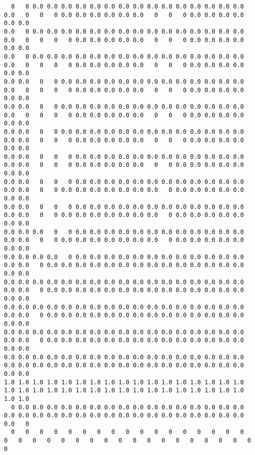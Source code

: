 \begin{verbatim}
  0   0 0.0 0.0 0.0 0.0 0.0 0.0 0.0 0.0 0.0 0.0 0.0 0.0 0.0 0.0 0.0 0.0   0   0   0 0.0 0.0 0.0 0.0 0.0 0.0   0   0   0 0.0 0.0 0.0 0.0 0.0 0.0
0.0   0 0.0 0.0 0.0 0.0 0.0 0.0 0.0 0.0 0.0 0.0 0.0 0.0 0.0 0.0 0.0 0.0   0   0   0   0 0.0 0.0 0.0 0.0 0.0   0   0   0 0.0 0.0 0.0 0.0 0.0 0.0
0.0   0 0.0 0.0 0.0 0.0 0.0 0.0 0.0 0.0 0.0 0.0 0.0 0.0 0.0 0.0 0.0 0.0   0   0   0   0 0.0 0.0 0.0 0.0 0.0   0   0   0 0.0 0.0 0.0 0.0 0.0 0.0
0.0 0.0   0   0 0.0 0.0 0.0 0.0 0.0 0.0 0.0 0.0 0.0 0.0 0.0 0.0 0.0 0.0   0   0   0   0 0.0 0.0 0.0 0.0 0.0   0   0   0 0.0 0.0 0.0 0.0 0.0 0.0
0.0 0.0   0   0 0.0 0.0 0.0 0.0 0.0 0.0 0.0 0.0 0.0 0.0 0.0 0.0 0.0 0.0   0   0   0   0 0.0 0.0 0.0 0.0 0.0   0   0   0 0.0 0.0 0.0 0.0 0.0 0.0
0.0 0.0   0   0 0.0 0.0 0.0 0.0 0.0 0.0 0.0 0.0 0.0 0.0 0.0 0.0 0.0 0.0 0.0   0   0   0 0.0 0.0 0.0 0.0 0.0   0   0   0 0.0 0.0 0.0 0.0 0.0 0.0
0.0 0.0   0   0   0 0.0 0.0 0.0 0.0 0.0 0.0 0.0 0.0 0.0 0.0 0.0 0.0 0.0 0.0   0   0   0 0.0 0.0 0.0 0.0 0.0   0   0 0.0 0.0 0.0 0.0 0.0 0.0 0.0
0.0 0.0   0   0   0 0.0 0.0 0.0 0.0 0.0 0.0 0.0 0.0 0.0 0.0 0.0 0.0 0.0 0.0   0   0 0.0 0.0 0.0 0.0 0.0 0.0 0.0   0 0.0 0.0 0.0 0.0 0.0 0.0 0.0
0.0 0.0   0   0   0 0.0 0.0 0.0 0.0 0.0 0.0 0.0 0.0 0.0 0.0 0.0 0.0 0.0 0.0   0   0 0.0 0.0 0.0 0.0 0.0 0.0 0.0   0 0.0 0.0 0.0 0.0 0.0 0.0 0.0
0.0 0.0 0.0   0   0 0.0 0.0 0.0 0.0 0.0 0.0 0.0 0.0 0.0 0.0 0.0 0.0 0.0 0.0   0   0 0.0 0.0 0.0 0.0 0.0 0.0 0.0   0 0.0 0.0 0.0 0.0 0.0 0.0 0.0
0.0 0.0 0.0 0.0   0 0.0 0.0 0.0 0.0 0.0 0.0 0.0 0.0 0.0 0.0 0.0 0.0 0.0 0.0   0 0.0 0.0 0.0 0.0 0.0 0.0 0.0 0.0 0.0 0.0 0.0 0.0 0.0 0.0 0.0 0.0
0.0 0.0 0.0 0.0 0.0 0.0 0.0 0.0 0.0 0.0 0.0 0.0 0.0 0.0 0.0 0.0 0.0 0.0 0.0   0 0.0 0.0 0.0 0.0 0.0 0.0 0.0 0.0 0.0 0.0 0.0 0.0 0.0 0.0 0.0 0.0
0.0 0.0 0.0 0.0 0.0 0.0 0.0 0.0 0.0 0.0 0.0 0.0 0.0 0.0 0.0 0.0 0.0 0.0 0.0   0 0.0 0.0 0.0 0.0 0.0 0.0 0.0 0.0 0.0 0.0 0.0 0.0 0.0 0.0 0.0 0.0
0.0 0.0 0.0 0.0 0.0 0.0 0.0 0.0 0.0 0.0 0.0 0.0 0.0 0.0 0.0 0.0 0.0 0.0 0.0   0 0.0 0.0 0.0 0.0 0.0 0.0 0.0 0.0 0.0 0.0 0.0 0.0 0.0 0.0 0.0 0.0
0.0 0.0 0.0 0.0 0.0 0.0 0.0 0.0 0.0 0.0 0.0 0.0 0.0 0.0 0.0 0.0 0.0 0.0 0.0 0.0 0.0 0.0 0.0 0.0 0.0 0.0 0.0 0.0 0.0 0.0 0.0 0.0 0.0 0.0 0.0 0.0
1.0 1.0 1.0 1.0 1.0 1.0 1.0 1.0 1.0 1.0 1.0 1.0 1.0 1.0 1.0 1.0 1.0 1.0 1.0 1.0 1.0 1.0 1.0 1.0 1.0 1.0 1.0 1.0 1.0 1.0 1.0 1.0 1.0 1.0 1.0 1.0
  0 0.0 0.0 0.0 0.0 0.0 0.0 0.0 0.0 0.0 0.0 0.0 0.0 0.0 0.0 0.0 0.0 0.0 0.0 0.0 0.0 0.0 0.0 0.0 0.0 0.0 0.0 0.0 0.0 0.0 0.0 0.0 0.0 0.0 0.0   0
  0   0   0   0   0   0   0   0   0   0   0   0   0   0   0   0   0   0   0   0   0   0   0   0   0   0   0   0   0   0   0   0   0   0   0   0
\end{verbatim}\normalsize

